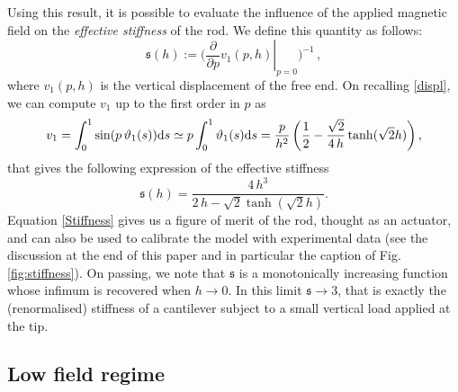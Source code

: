 \documentclass[oneside]{article}
\begin{document}
			Using this result, it is possible to evaluate the influence of the applied magnetic field on the \emph{effective stiffness} of the rod. We define this quantity as follows:
			\begin{equation}
			\mathfrak{s}(h) :=\Big(\left.\frac{\partial}{\partial p} v_1(p,h)\right\vert_{p=0}\Big)^{-1}\,,
			\end{equation}
			where $v_1(p,h)$ is the vertical displacement of the free end. On recalling \eqref{displ}, we can compute $v_1$ up to the first order in $p$ as
			\begin{equation}
			v_1=\int_{0}^{1}\sin(p\,\vartheta_1(s)){\rm d}s\simeq p\int_{0}^{1}\vartheta_1(s){\rm d}s=\frac{p}{h^2}\left( \frac 12 - \frac{\sqrt{2}}{4\,h}\tanh(\sqrt{2}h) \right),
			\label{tipdisp}
			\end{equation}
			that gives the following expression of the effective stiffness
			\begin{equation}
			\mathfrak{s}(h)=\frac{4\,h^3}{2\,h-\sqrt{2}\tanh(\sqrt{2}h)}.
			\label{Stiffness}
			\end{equation} 
			Equation \eqref{Stiffness} gives us a figure of merit of the rod, thought as an actuator, and  can also be used to calibrate the model with experimental data (see the discussion at the end of this paper and in particular the caption of Fig.\eqref{fig:stiffness}). 
			On passing, we note that $\mathfrak{s}$ is a monotonically increasing function whose infimum is recovered when $h\to 0$. In this limit $
			\mathfrak{s}\to3$, that is exactly the (renormalised) stiffness of a cantilever subject to a small vertical load applied at the tip.
			
			\subsection{Low field regime}\label{lowfield}
			
\end{document}
